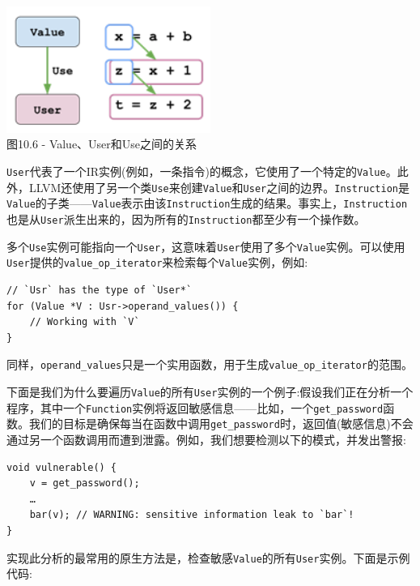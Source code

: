 \hspace*{\fill} \\ %
\begin{center}
\includegraphics[width=0.5\textwidth]{content/3/chapter10/images/6.png}\\
图10.6 - Value、User和Use之间的关系
\end{center}

\texttt{User}代表了一个IR实例(例如，一条指令)的概念，它使用了一个特定的\texttt{Value}。此外，LLVM还使用了另一个类\texttt{Use}来创建\texttt{Value}和\texttt{User}之间的边界。\texttt{Instruction}是\texttt{Value}的子类——\texttt{Value}表示由该\texttt{Instruction}生成的结果。事实上，\texttt{Instruction}也是从\texttt{User}派生出来的，因为所有的\texttt{Instruction}都至少有一个操作数。

多个\texttt{Use}实例可能指向一个\texttt{User}，这意味着\texttt{User}使用了多个\texttt{Value}实例。可以使用\texttt{User}提供的\texttt{value\_op\_iterator}来检索每个\texttt{Value}实例，例如:

\begin{lstlisting}[style=styleCXX]
// `Usr` has the type of `User*`
for (Value *V : Usr->operand_values()) {
	// Working with `V`
}
\end{lstlisting}

同样，\texttt{operand\_values}只是一个实用函数，用于生成\texttt{value\_op\_iterator}的范围。

下面是我们为什么要遍历\texttt{Value}的所有\texttt{User}实例的一个例子:假设我们正在分析一个程序，其中一个\texttt{Function}实例将返回敏感信息——比如，一个\texttt{get\_password}函数。我们的目标是确保每当在函数中调用\texttt{get\_password}时，返回值(敏感信息)不会通过另一个函数调用而遭到泄露。例如，我们想要检测以下的模式，并发出警报:

\begin{lstlisting}[style=styleCXX]
void vulnerable() {
	v = get_password();
	…
	bar(v); // WARNING: sensitive information leak to `bar`!
}
\end{lstlisting}

实现此分析的最常用的原生方法是，检查敏感\texttt{Value}的所有\texttt{User}实例。下面是示例代码:

